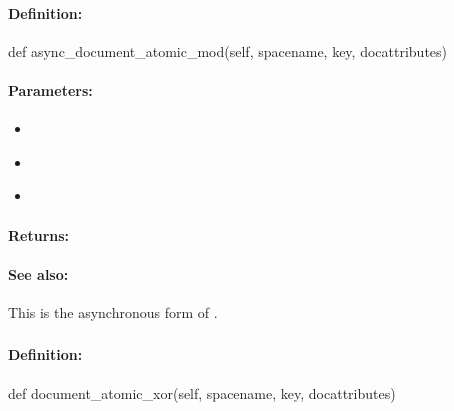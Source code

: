 \paragraph{Definition:}
\begin{pythoncode}
def async_document_atomic_mod(self, spacename, key, docattributes)
\end{pythoncode}

\paragraph{Parameters:}
\begin{itemize}[noitemsep]
\item {}\\

\item {}\\

\item {}\\

\end{itemize}

\paragraph{Returns:}


\paragraph{See also:}  This is the asynchronous form of .

\pagebreak
\subsubsection{}
\label{api:python:document_atomic_xor}


\paragraph{Definition:}
\begin{pythoncode}
def document_atomic_xor(self, spacename, key, docattributes)
\end{pythoncode}

